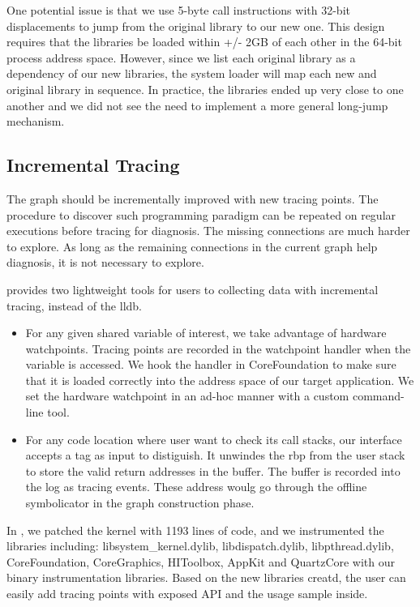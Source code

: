 One potential issue is that we use 5-byte call instructions with 32-bit displacements to jump from the original library to our new one.
This design requires that the libraries be loaded within +/- 2GB of each other in the 64-bit process address space.
However, since we list each original library as a dependency of our new libraries, the system loader will map each new and original library in sequence.
In practice, the libraries ended up very close to one another and we did not see the need to implement a more general long-jump mechanism.

\subsection{Incremental Tracing}
The graph should be incrementally improved with new tracing points.
The procedure to discover such programming paradigm can be repeated on regular executions before tracing for diagnosis.
The missing connections are much harder to explore.
As long as the remaining connections in the current graph help diagnosis, it is not necessary to explore.

\xxx provides two lightweight tools for users to collecting data with incremental tracing, instead of the lldb.
\begin {itemize}
\item For any given shared variable of interest, we take advantage of hardware watchpoints.
	Tracing points are recorded in the watchpoint handler when the variable is accessed.
	We hook the handler in CoreFoundation to make sure that it is loaded correctly into the address space of our target application.
	We set the hardware watchpoint in an ad-hoc manner with a custom command-line tool.
\item For any code location where user want to check its call stacks, our interface accepts a tag as input to distiguish.
	It unwindes the rbp from the user stack to store the valid return addresses in the buffer. The buffer is recorded into the log as tracing events.
	These address woulg go through the offline symbolicator in the graph construction phase.
\end{itemize}

In \xxx, we patched the kernel with 1193 lines of code,
and we instrumented the libraries including: libsystem\_kernel.dylib, libdispatch.dylib, libpthread.dylib, CoreFoundation, CoreGraphics, HIToolbox, AppKit and QuartzCore with our binary instrumentation libraries. 
Based on the new libraries creatd, the user can easily add tracing points with exposed API and the usage sample inside.

